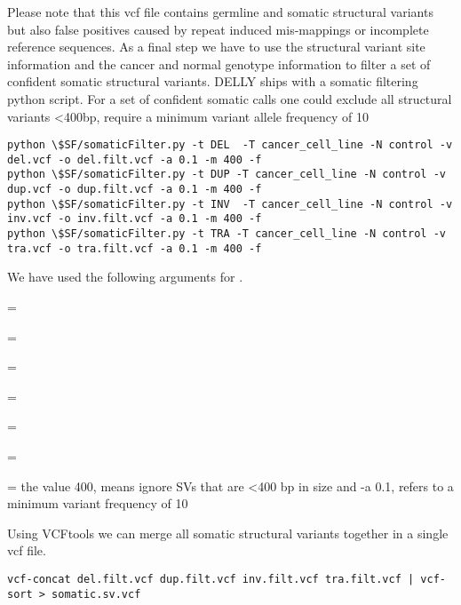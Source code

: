 \begin{steps}
\begin{information}
Please note that this vcf file contains germline and somatic structural variants but also false positives caused by repeat induced mis-mappings or incomplete reference sequences. As a final step we have to use the structural variant site information and the cancer and normal genotype information to filter a set of confident somatic structural variants. DELLY ships with a somatic filtering python script. For a set of confident somatic calls one could exclude all structural variants <400bp, require a minimum variant allele frequency of 10%

\end{information}
\begin{steps}
\begin{lstlisting}
python \$SF/somaticFilter.py -t DEL  -T cancer_cell_line -N control -v del.vcf -o del.filt.vcf -a 0.1 -m 400 -f
python \$SF/somaticFilter.py -t DUP -T cancer_cell_line -N control -v dup.vcf -o dup.filt.vcf -a 0.1 -m 400 -f
python \$SF/somaticFilter.py -t INV  -T cancer_cell_line -N control -v inv.vcf -o inv.filt.vcf -a 0.1 -m 400 -f
python \$SF/somaticFilter.py -t TRA -T cancer_cell_line -N control -v tra.vcf -o tra.filt.vcf -a 0.1 -m 400 -f
\end{lstlisting}
\end{steps}

We have used the following arguments for .
\begin{description}[style=multiline,labelindent=0cm,align=right,leftmargin=\descriptionlabelspace,rightmargin=1.5cm,font=\ttfamily]
  \item[-t] = 
  \item[-T] = 
  \item[-N] = 
  \item[-v] = 
  \item[-o] = 
  \item[-a] = 
  \item[-m] = the value 400, means ignore SVs that are <400 bp in size and -a 0.1, refers to a minimum variant frequency of 10%
\end{description}


\begin{steps}
Using VCFtools we can merge all somatic structural variants together in a single vcf file.
\begin{lstlisting}
vcf-concat del.filt.vcf dup.filt.vcf inv.filt.vcf tra.filt.vcf | vcf-sort > somatic.sv.vcf
\end{lstlisting}
\end{steps}


\end{steps}
